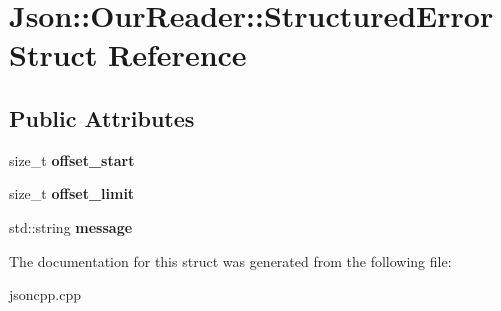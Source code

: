 \hypertarget{struct_json_1_1_our_reader_1_1_structured_error}{\section{Json\-:\-:Our\-Reader\-:\-:Structured\-Error Struct Reference}
\label{struct_json_1_1_our_reader_1_1_structured_error}
}
\subsection*{Public Attributes}
\begin{DoxyCompactItemize}
\item 
\hypertarget{struct_json_1_1_our_reader_1_1_structured_error_a4eec161c2a6b4c89b6eb3d8d83834443}{size\-\_\-t {\bfseries offset\-\_\-start}}\label{struct_json_1_1_our_reader_1_1_structured_error_a4eec161c2a6b4c89b6eb3d8d83834443}

\item 
\hypertarget{struct_json_1_1_our_reader_1_1_structured_error_a6bab2650e5230fc15427b309de79fdbe}{size\-\_\-t {\bfseries offset\-\_\-limit}}\label{struct_json_1_1_our_reader_1_1_structured_error_a6bab2650e5230fc15427b309de79fdbe}

\item 
\hypertarget{struct_json_1_1_our_reader_1_1_structured_error_adc8a757b6452cc6ab14fb90b933b3414}{std\-::string {\bfseries message}}\label{struct_json_1_1_our_reader_1_1_structured_error_adc8a757b6452cc6ab14fb90b933b3414}

\end{DoxyCompactItemize}


The documentation for this struct was generated from the following file\-:\begin{DoxyCompactItemize}
\item 
jsoncpp.\-cpp\end{DoxyCompactItemize}
